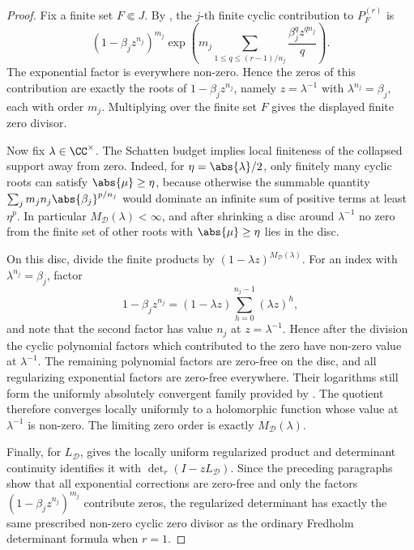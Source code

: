 \begin{proof}
  Fix a finite set \(F\Subset J\). By
  , the \(j\)-th finite
  cyclic contribution to \(P_F^{(r)}\) is
  \[
    (1-\beta_jz^{n_j})^{m_j}
    \exp\!\left(
      m_j\sum_{1\le q\le(r-1)/n_j}
        \frac{\beta_j^qz^{qn_j}}{q}
    \right).
  \]
  The exponential factor is everywhere non-zero. Hence the zeros of this
  contribution are exactly the roots of \(1-\beta_jz^{n_j}\), namely
  \(z=\lambda^{-1}\) with \(\lambda^{n_j}=\beta_j\), each with order
  \(m_j\). Multiplying over the finite set \(F\) gives the displayed finite
  zero divisor.

  Now fix \(\lambda\in\CC^\times\). The Schatten budget implies local
  finiteness of the collapsed support away from zero. Indeed, for
  \(\eta=\abs{\lambda}/2\), only finitely many cyclic roots can satisfy
  \(\abs{\mu}\ge\eta\), because otherwise the summable quantity
  \(\sum_jm_jn_j\abs{\beta_j}^{p/n_j}\) would dominate an infinite sum of
  positive terms at least \(\eta^p\). In particular
  \(M_{\mathcal D}(\lambda)<\infty\), and after shrinking a disc around
  \(\lambda^{-1}\) no zero from the finite set of other roots with
  \(\abs{\mu}\ge\eta\) lies in the disc.

  On this disc, divide the finite products by
  \((1-\lambda z)^{M_{\mathcal D}(\lambda)}\). For an index with
  \(\lambda^{n_j}=\beta_j\), factor
  \[
    1-\beta_jz^{n_j}
    =(1-\lambda z)\sum_{h=0}^{n_j-1}(\lambda z)^h,
  \]
  and note that the second factor has value \(n_j\) at
  \(z=\lambda^{-1}\). Hence after the division the cyclic polynomial factors
  which contributed to the zero have non-zero value at \(\lambda^{-1}\). The
  remaining polynomial factors are zero-free on the disc, and all
  regularizing exponential factors are zero-free everywhere. Their logarithms
  still form the uniformly absolutely convergent family provided by
  . The quotient therefore
  converges locally uniformly to a holomorphic function whose value at
  \(\lambda^{-1}\) is non-zero. The limiting zero order is exactly
  \(M_{\mathcal D}(\lambda)\).

  Finally, for \(L_{\mathcal D}\),
   gives the locally
  uniform regularized product and determinant continuity identifies it with
  \(\det_r(I-zL_{\mathcal D})\). Since the preceding paragraphs show that
  all exponential corrections are zero-free and only the factors
  \((1-\beta_jz^{n_j})^{m_j}\) contribute zeros, the regularized determinant
  has exactly the same prescribed non-zero cyclic zero divisor as the
  ordinary Fredholm determinant formula when \(r=1\).
\end{proof}

